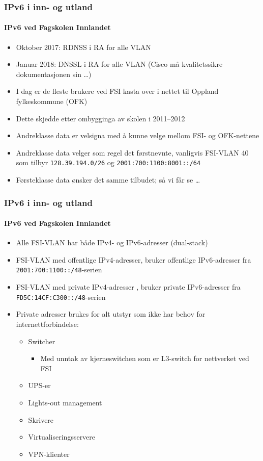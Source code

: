 \begin{frame}
  \frametitle{IPv6 i inn- og utland}
  \framesubtitle{IPv6 ved Fagskolen Innlandet}
  \begin{itemize}
  \item Oktober 2017: RDNSS i RA for alle VLAN
  \item Januar 2018: DNSSL i RA for alle VLAN\newline
    \phantom{X}\hfill(Cisco må kvalitetssikre dokumentasjonen sin \dots)
  \item I dag er de fleste brukere ved FSI kasta over i nettet til
    Oppland fylkeskommune (OFK)
  \item Dette skjedde etter ombygginga av skolen i 2011--2012
  \item Andreklasse data er velsigna med å kunne velge mellom FSI- og
    OFK-nettene
  \item Andreklasse data velger som regel det førstnevnte, vanligvis
    FSI-VLAN 40 som tilbyr \texttt{128.39.194.0/26} og
    \texttt{2001:700:1100:8001::/64}
  \item Førsteklasse data ønsker det samme tilbudet; så vi får se \dots
  \end{itemize}
\end{frame}

\begin{frame}
  \frametitle{IPv6 i inn- og utland}
  \framesubtitle{IPv6 ved Fagskolen Innlandet}
  \begin{itemize}
  \item Alle FSI-VLAN har både IPv4- og IPv6-adresser (dual-stack)
  \item FSI-VLAN med offentlige IPv4-adresser, bruker offentlige
    IPv6-adresser fra \texttt{2001:700:1100::/48}-serien
  \item FSI-VLAN med private IPv4-adresser , bruker private
    IPv6-adresser fra \texttt{FD5C:14CF:C300::/48}-serien
  \item Private adresser brukes for alt utstyr som ikke har behov for
    internettforbindelse:
    \begin{itemize}
    \item Switcher
      \begin{itemize}
      \item Med unntak av kjerneswitchen som er L3-switch for
        nettverket ved FSI
      \end{itemize}
    \item UPS-er
    \item Lights-out management
    \item Skrivere
    \item Virtualiseringsservere
    \item VPN-klienter
    \end{itemize}
  \end{itemize}
\end{frame}

